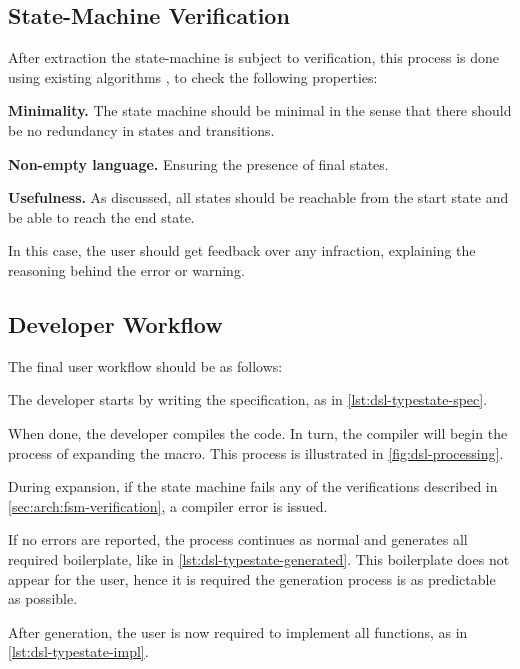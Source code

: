 \subsection{State-Machine Verification}\label{sec:arch:fsm-verification}
After extraction the state-machine is subject to verification,
this process is done using existing algorithms \autocite{Hopcroft2013}, to check the following properties:
\begin{compactitem}
    \item \textbf{Minimality.} The state machine should be minimal in the sense that there should be no redundancy in states and transitions.
    \item \textbf{Non-empty language.} Ensuring the presence of final states.
    \item \textbf{Usefulness.} As discussed, all states should be reachable from the start state and be able to reach the end state.
\end{compactitem}
In this case, the user should get feedback over any infraction,
explaining the reasoning behind the error or warning.

\subsection{Developer Workflow}
The final user workflow should be as follows:
\begin{compactenum}
    \item The developer starts by writing the specification, as in \autoref{lst:dsl-typestate-spec}.
    \item When done, the developer compiles the code.
    In turn, the compiler will begin the process of expanding the macro.
    This process is illustrated in \autoref{fig:dsl-processing}.
    \begin{compactitem}
        \item During expansion, if the state machine fails any of the verifications described in \autoref{sec:arch:fsm-verification},
        a compiler error is issued.
        \item If no errors are reported, the process continues as normal and generates all required boilerplate, like in \autoref{lst:dsl-typestate-generated}.
        This boilerplate does not appear for the user, hence it is required the generation process is as predictable as possible.
    \end{compactitem}
    \item After generation, the user is now required to implement all functions, as in \autoref{lst:dsl-typestate-impl}.
\end{compactenum}


